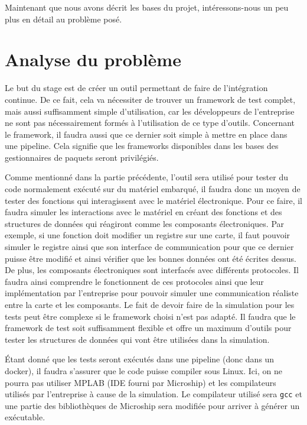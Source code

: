 \documentclass[a4paper]{article}
\begin{document}
Maintenant que nous avons décrit les bases du projet, intéressons-nous un peu
plus en détail au problème posé.
\section{Analyse du problème}%
\label{analproblem}

Le but du stage est de créer un outil permettant de faire de l'intégration
continue. De ce fait, cela va nécessiter de trouver un framework de test complet,
mais aussi suffisamment simple d'utilisation, car les développeurs de
l'entreprise ne sont pas nécessairement formés à l'utilisation de ce type
d'outils. Concernant le framework, il faudra aussi que ce dernier soit simple à
mettre en place dans une pipeline. Cela signifie que les frameworks disponibles
dans les bases des gestionnaires de paquets seront privilégiés.

Comme mentionné dans la partie précédente, l'outil sera utilisé pour tester du
code normalement exécuté sur du matériel embarqué, il faudra donc un moyen de
tester des fonctions qui interagissent avec le matériel électronique. Pour ce
faire, il faudra simuler les interactions avec le matériel en créant des
fonctions et des structures de données qui réagiront comme les composants
électroniques. Par exemple, si une fonction doit modifier un registre sur une
carte, il faut pouvoir simuler le registre ainsi que son interface de
communication pour que ce dernier puisse être modifié et ainsi vérifier que les
bonnes données ont été écrites dessus. De plus, les composants électroniques
sont interfacés avec différents protocoles. Il faudra ainsi comprendre le
fonctionnent de ces protocoles ainsi que leur implémentation par l'entreprise
pour pouvoir simuler une communication réaliste entre la carte et les
composants. Le fait de devoir faire de la simulation pour les tests peut être
complexe si le framework choisi n'est pas adapté. Il faudra que le framework de
test soit suffisamment flexible et offre un maximum d'outils pour tester les
structures de données qui vont être utilisées dans la simulation.

Étant donné que les tests seront exécutés dans une pipeline (donc dans un
docker), il faudra s'assurer que le code puisse compiler sous Linux. Ici, on ne
pourra pas utiliser MPLAB (IDE fourni par Microship) et les compilateurs
utilisés par l'entreprise à cause de la simulation. Le compilateur utilisé sera
\verb|gcc| et une partie des bibliothèques de Microship sera modifiée pour
arriver à générer un exécutable.
\end{document}
